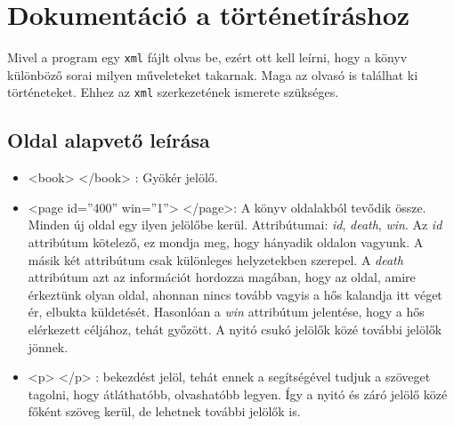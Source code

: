 \documentclass[12pt,a4paper,oneside]{report}
\newcommand{\xtag}[1]{{\color{Tag}#1}}
\newcommand{\xattr}[2]{{\color{Attr}#1}={\color{Value}''#2''}}
\newcommand{\attr}{\emph}
\newcommand{\proglang}{\texttt}
\begin{document}
  \section{Dokumentáció a történetíráshoz}
    Mivel a program egy \proglang{xml} fájlt olvas be, ezért ott kell
    leírni, hogy a könyv különböző sorai milyen műveleteket
    takarnak. Maga az olvasó is találhat ki történeteket. Ehhez az
    \proglang{xml} szerkezetének ismerete szükséges.

    \subsection{Oldal alapvető leírása}
      \begin{itemize}
        \item <\xtag{book}> <\xtag{/book}> : Gyökér jelölő.

        \item <\xtag{page} \xattr{id}{400} \xattr{win}{1}>
          <\xtag{/page}>: A könyv oldalakból tevődik
          össze. Minden új oldal egy ilyen jelölőbe
          kerül. Attribútumai: \attr{id}, \attr{death}, \attr{win}.
          Az \attr{id} attribútum kötelező, ez mondja meg, hogy
          hányadik oldalon vagyunk. A másik két attribútum csak
          különleges helyzetekben szerepel. A \attr{death} attribútum
          azt az információt hordozza magában, hogy az oldal, amire
          érkeztünk olyan oldal, ahonnan nincs tovább vagyis a hős
          kalandja itt véget ér, elbukta küldetését. Hasonlóan a
          \attr{win} attribútum jelentése, hogy a hős elérkezett
          céljához, tehát győzött. A nyitó csukó jelölők közé további
          jelölők jönnek.
          
        \item <\xtag{p}> <\xtag{/p}> : bekezdést jelöl, tehát ennek a
          segítségével tudjuk a szöveget tagolni, hogy átláthatóbb,
          olvashatóbb legyen. Így a nyitó és záró jelölő közé főként
          szöveg kerül, de lehetnek további jelölők is.
      \end{itemize}
      
\end{document}
